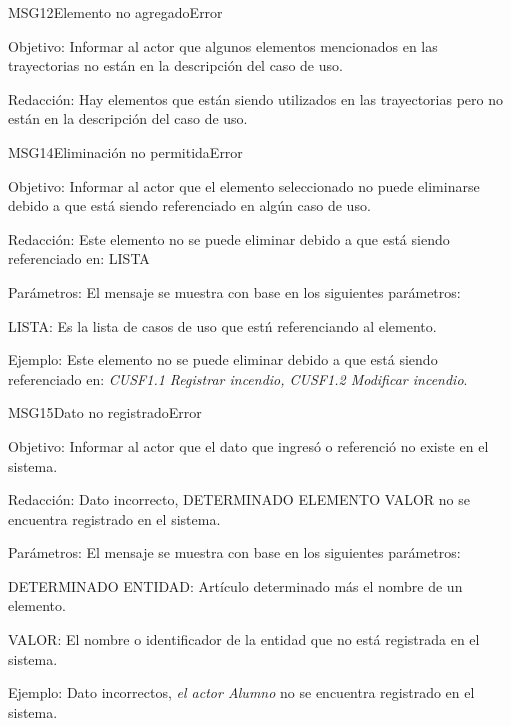 \begin{mensaje}{MSG12}{Elemento no agregado}{Error}
    \item[Objetivo:] Informar al actor que algunos elementos mencionados en las trayectorias no están en la descripción del caso de uso.
    \item[Redacción:] Hay elementos que están siendo utilizados en las trayectorias pero no están en la descripción del caso de uso.
\end{mensaje}
\begin{mensaje}{MSG14}{Eliminación no permitida}{Error}
    \item[Objetivo:] Informar al actor que el elemento seleccionado no puede eliminarse debido a que está siendo referenciado en algún caso de uso.
    \item[Redacción:] Este elemento no se puede eliminar debido a que está siendo referenciado en: LISTA
    \item[Parámetros:] El mensaje se muestra con base en los siguientes parámetros:
    \begin{Citemize}
	\item LISTA: Es la lista de casos de uso que estń referenciando al elemento.
    \end{Citemize}
    \item[Ejemplo:] Este elemento no se puede eliminar debido a que está siendo referenciado en: {\em CUSF1.1 Registrar incendio, CUSF1.2 Modificar incendio}.
\end{mensaje}
\begin{mensaje}{MSG15}{Dato no registrado}{Error}
    \item[Objetivo:] Informar al actor que el dato que ingresó o referenció no existe en el sistema.
    \item[Redacción:] Dato incorrecto, DETERMINADO ELEMENTO VALOR no se encuentra registrado en el sistema.
    \item[Parámetros:] El mensaje se muestra con base en los siguientes parámetros:
    \begin{Citemize}
	\item DETERMINADO ENTIDAD: Artículo determinado más el nombre de un elemento.
	\item VALOR: El nombre o identificador de la entidad que no está registrada en el sistema.
    \end{Citemize}
    \item[Ejemplo:] Dato incorrectos, { \em el actor Alumno} no se encuentra registrado en el sistema.
\end{mensaje}
